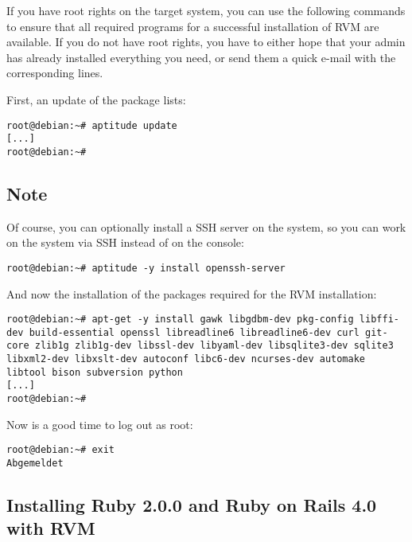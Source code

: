 \documentclass[a4paper]{book}
\begin{document}
If you have root rights on the target system, you can use the following commands to ensure that all required programs for a successful installation of RVM are available. If you do not have root rights, you have to either hope that your admin has already installed everything you need, or send them a quick e-mail with the corresponding lines.

First, an update of the package lists:

\begin{shaded}\begin{verbatim}
root@debian:~# aptitude update
[...]
root@debian:~#
\end{verbatim}\end{shaded}

\subsection{Note}\label{note-1}

Of course, you can optionally install a SSH server on the system, so you can work on the system via SSH instead of on the console:

\begin{shaded}\begin{verbatim}
root@debian:~# aptitude -y install openssh-server
\end{verbatim}\end{shaded}

And now the installation of the packages required for the RVM installation:

\begin{shaded}\begin{verbatim}
root@debian:~# apt-get -y install gawk libgdbm-dev pkg-config libffi-dev build-essential openssl libreadline6 libreadline6-dev curl git-core zlib1g zlib1g-dev libssl-dev libyaml-dev libsqlite3-dev sqlite3 libxml2-dev libxslt-dev autoconf libc6-dev ncurses-dev automake libtool bison subversion python
[...]
root@debian:~#
\end{verbatim}\end{shaded}

Now is a good time to log out as root:

\begin{shaded}\begin{verbatim}
root@debian:~# exit
Abgemeldet
\end{verbatim}\end{shaded}

\subsection{Installing Ruby 2.0.0 and Ruby on Rails 4.0 with RVM}\label{installing-ruby-2.0.0-and-ruby-on-rails-4.0-with-rvm}
\end{document}
